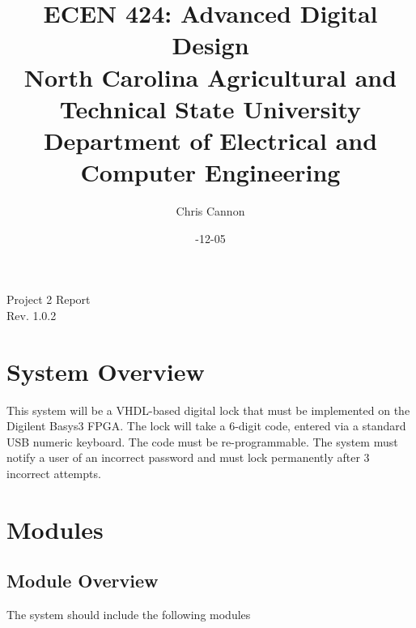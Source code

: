 \documentclass[11pt]{article}
\title {{\titleFont ECEN 424: Advanced Digital Design\\ North Carolina Agricultural and Technical State University \\ Department of Electrical and Computer Engineering}} %
\author{\titleFont Chris Cannon} %
\date{\titleFont 2018-12-05}
\begin{document}
\begin{titlingpage}
\maketitle
\begin{center}
	Project 2 Report \\ Rev. 1.0.2
\end{center}
\end{titlingpage}

\tableofcontents

\pagebreak

\section{System Overview}
This system will be a VHDL-based digital lock that must be implemented on the Digilent Basys3 FPGA. The lock will take a 6-digit code, entered via a standard USB numeric keyboard. The code must be re-programmable. The system must notify a user of an incorrect password and must lock permanently after 3 incorrect attempts.

\section{Modules}

\subsection{Module Overview}

The system should include the following modules
\end{document}
